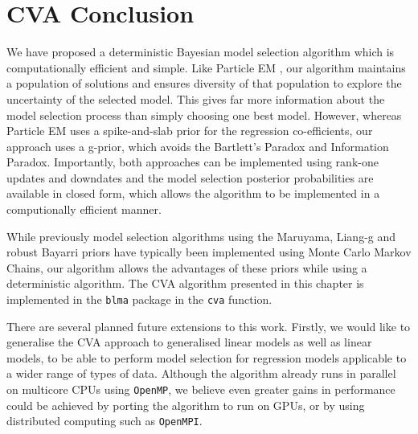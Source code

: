 \section{CVA Conclusion}

We have proposed a deterministic Bayesian model selection algorithm which is computationally efficient
and simple. Like Particle EM \cite{Rockova2017}, our algorithm maintains a population of solutions and ensures
diversity of that population to explore the uncertainty of the selected model. This gives far more information
about the model selection process than simply choosing one best model. However, whereas Particle EM uses
a spike-and-slab prior for the regression co-efficients, our approach uses a g-prior, which avoids 
the Bartlett's Paradox and Information Paradox. Importantly, both approaches can be implemented using rank-one
updates and downdates and the model selection posterior probabilities are available in closed form,
which allows the algorithm to be implemented in a computionally efficient manner.

While previously model selection algorithms using the Maruyama, Liang-g and robust Bayarri priors have
typically been implemented using Monte Carlo Markov Chains, our algorithm allows the advantages of these
priors while using a deterministic algorithm. The CVA algorithm  presented in this chapter is implemented in
the {\tt blma} package in the {\tt cva} function.

There are several planned future extensions to this work. Firstly, we would like to generalise the CVA
approach to generalised linear models as well as linear models, to be able to perform model selection for
regression models applicable to a wider range of types of data. Although the algorithm already runs in
parallel on multicore CPUs using \texttt{OpenMP}, we believe even greater gains in performance could be
achieved by porting the algorithm to run on GPUs, or by using distributed computing such as \texttt{OpenMPI}.